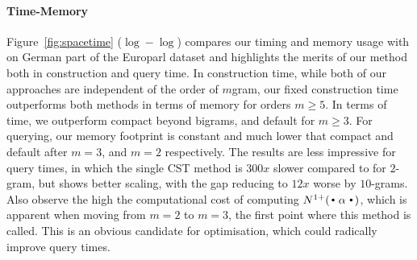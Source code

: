 \paragraph{Time-Memory}
Figure~\ref{fig:spacetime} ($\log-\log$) compares our timing and memory usage with \SRILM on German part of the Europarl dataset and highlights the merits of our method both in construction and query time. In construction time, while both of our approaches are independent of the order of $m$gram, our fixed construction time outperforms both \SRILM methods in terms of memory for orders $m \ge 5$. 
In terms of time, we outperform \SRILM compact beyond bigrams, and \SRILM default for $m \ge 3$. 
For querying, our memory footprint is constant and much lower that \SRILM compact and \SRILM default after $m=3$, and $m=2$ respectively. 
The results are less impressive for query times, in which the single CST method is $300x$ slower compared to \SRILM for $2$-gram, but shows better scaling, with the gap reducing to $12x$ worse by $10$-grams.  
Also observe the high the computational cost of computing $\nlplus{\Bigcdot \alpha \Bigcdot}$, which is apparent when moving from $m=2$ to $m=3$, the first point where this method is called. 
This is an obvious candidate for optimisation, which could radically improve query times.






